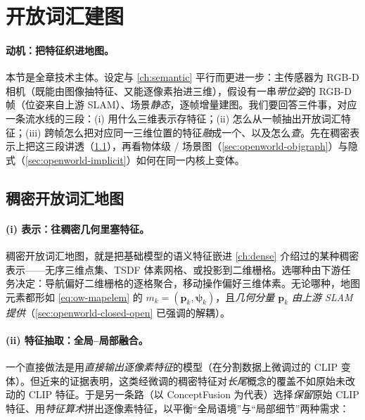 \section{开放词汇建图}
\label{sec:openworld-mapping}

\paragraph{动机：把特征织进地图。}
本节是全章技术主体。设定与 \cref{ch:semantic} 平行而更进一步：主传感器为 RGB-D 相机（既能由图像抽特征、又能逐像素抬进三维），假设有一串\emph{带位姿}的 RGB-D 帧（位姿来自上游 SLAM）、场景\emph{静态}，逐帧增量建图\cite{paull2026openworld}。我们要回答三件事，对应一条流水线的三段：(i) 用什么三维表示存特征；(ii) 怎么从一帧抽出开放词汇特征；(iii) 跨帧怎么把对应同一三维位置的特征\emph{融}成一个、以及怎么\emph{查}。先在稠密表示上把这三段讲透（\cref{sec:openworld-dense}），再看物体级 / 场景图（\cref{sec:openworld-objgraph}）与隐式（\cref{sec:openworld-implicit}）如何在同一内核上变体。

\subsection{稠密开放词汇地图}
\label{sec:openworld-dense}

\paragraph{(i) 表示：往稠密几何里塞特征。}
稠密开放词汇地图，就是把基础模型的语义特征嵌进 \cref{ch:dense} 介绍过的某种稠密表示——无序三维点集、TSDF 体素网格、或投影到二维栅格。选哪种由下游任务决定：导航偏好二维栅格的逐格聚合，移动操作偏好三维体素\cite{paull2026openworld}。无论哪种，地图元素都形如 \cref{eq:ow-mapelem} 的 $m_k=(\mathbf{p}_k,\boldsymbol\psi_k)$，且\emph{几何分量 $\mathbf{p}_k$ 由上游 SLAM 提供}（\cref{sec:openworld-closed-open} 已强调的解耦）。

\paragraph{(ii) 特征抽取：全局--局部融合。}
一个直接做法是用\emph{直接输出逐像素特征}的模型（在分割数据上微调过的 CLIP 变体）。但近来的证据表明，这类经微调的稠密特征对\emph{长尾}概念的覆盖不如原始未改动的 CLIP 特征\cite{paull2026openworld}。于是另一条路（以 ConceptFusion 为代表\cite{jatavallabhula2023conceptfusion}）选择\emph{保留}原始 CLIP 特征、用\emph{特征算术}拼出逐像素特征，以平衡“全局语境”与“局部细节”两种需求：

